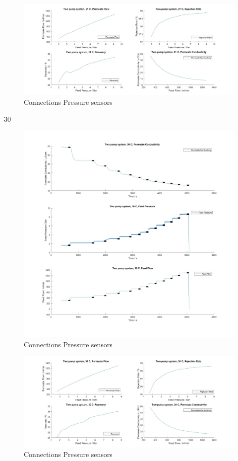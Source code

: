 \begin{figure}[H]
    \centering
    \includegraphics[width=1.1\textwidth]{FeedPumpIncrease21Key}
    \caption{Connections Pressure sensors}
    \label{fig:PressConn}
\end{figure}

30


\begin{figure}[H]
    \centering
    \includegraphics[width=1.1\textwidth]{FeedPumpIncrease30}
    \caption{Connections Pressure sensors}
    \label{fig:PressConn}
\end{figure}


\begin{figure}[H]
    \centering
    \includegraphics[width=1.1\textwidth]{FeedPumpIncrease30Key}
    \caption{Connections Pressure sensors}
    \label{fig:PressConn}
\end{figure}

